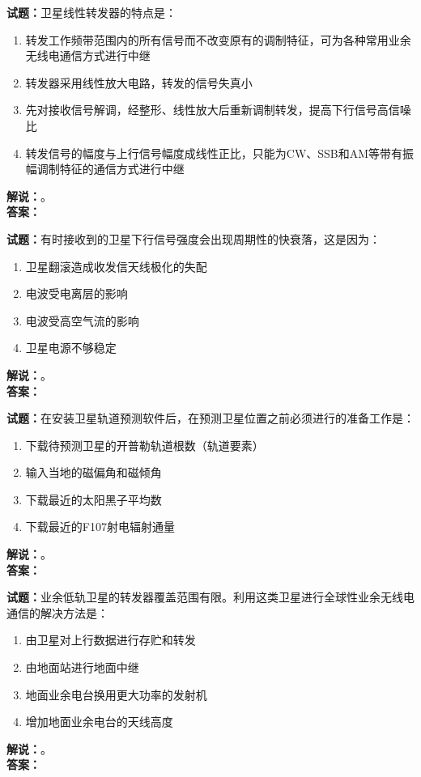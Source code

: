 \documentclass{ctexbook}
\begin{document}
\bigskip

\noindent\textbf{试题：}卫星线性转发器的特点是：
\begin{enumerate}[leftmargin=3em]
  \item 转发工作频带范围内的所有信号而不改变原有的调制特征，可为各种常用业余无线电通信方式进行中继
  \item 转发器采用线性放大电路，转发的信号失真小
  \item 先对接收信号解调，经整形、线性放大后重新调制转发，提高下行信号高信噪比
  \item 转发信号的幅度与上行信号幅度成线性正比，只能为CW、SSB和AM等带有振幅调制特征的通信方式进行中继
\end{enumerate}
\noindent\textbf{解说：}\textbf{}。\\\noindent\textbf{答案：}

\bigskip

\noindent\textbf{试题：}有时接收到的卫星下行信号强度会出现周期性的快衰落，这是因为：
\begin{enumerate}[leftmargin=3em]
  \item 卫星翻滚造成收发信天线极化的失配
  \item 电波受电离层的影响
  \item 电波受高空气流的影响
  \item 卫星电源不够稳定
\end{enumerate}
\noindent\textbf{解说：}\textbf{}。\\\noindent\textbf{答案：}

\bigskip

\noindent\textbf{试题：}在安装卫星轨道预测软件后，在预测卫星位置之前必须进行的准备工作是：
\begin{enumerate}[leftmargin=3em]
  \item 下载待预测卫星的开普勒轨道根数（轨道要素）
  \item 输入当地的磁偏角和磁倾角
  \item 下载最近的太阳黑子平均数
  \item 下载最近的F107射电辐射通量
\end{enumerate}
\noindent\textbf{解说：}\textbf{}。\\\noindent\textbf{答案：}

\bigskip

\noindent\textbf{试题：}业余低轨卫星的转发器覆盖范围有限。利用这类卫星进行全球性业余无线电通信的解决方法是：
\begin{enumerate}[leftmargin=3em]
  \item 由卫星对上行数据进行存贮和转发
  \item 由地面站进行地面中继
  \item 地面业余电台换用更大功率的发射机
  \item 增加地面业余电台的天线高度
\end{enumerate}
\noindent\textbf{解说：}\textbf{}。\\\noindent\textbf{答案：}
\end{document}
